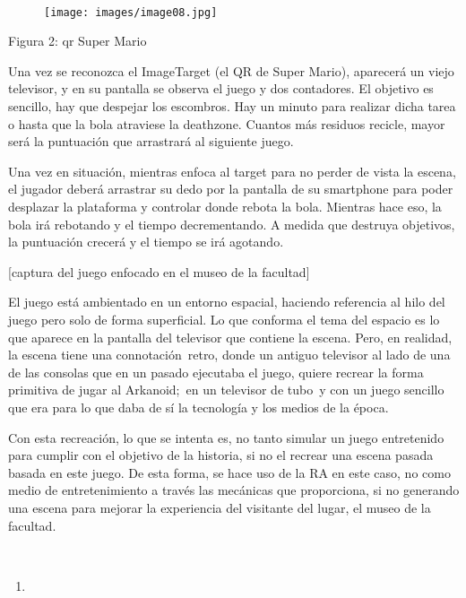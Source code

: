 ~~~~~~~~~~~~~~~~~ ~~~~~~~~~~~~~~~~~

\begin{figure}[htbp]
\centering
\texttt{[image: images/image08.jpg]}
\end{figure}

Figura 2: qr Super Mario

Una vez se reconozca el ImageTarget (el QR de Super Mario), aparecerá un
viejo televisor, y en su pantalla se observa el juego y dos contadores.
El objetivo es sencillo, hay que despejar los escombros. Hay un minuto
para realizar dicha tarea o hasta que la bola atraviese la deathzone.
Cuantos más residuos recicle, mayor será la puntuación que arrastrará al
siguiente juego.

Una vez en situación, mientras enfoca al target para no perder de vista
la escena, el jugador deberá arrastrar su dedo por la pantalla de su
smartphone para poder desplazar la plataforma y controlar donde rebota
la bola. Mientras hace eso, la bola irá rebotando y el tiempo
decrementando. A medida que destruya objetivos, la puntuación crecerá y
el tiempo se irá agotando.

{[}captura del juego enfocado en el museo de la facultad{]}

El juego está ambientado en un entorno espacial, haciendo referencia al
hilo del juego pero solo de forma superficial. Lo que conforma el tema
del espacio es lo que aparece en la pantalla del televisor que contiene
la escena. Pero, en realidad, la escena tiene una connotación~retro,
donde un antiguo televisor al lado de una de las consolas que en un
pasado ejecutaba el juego, quiere recrear la forma primitiva de jugar al
Arkanoid;~en un televisor de tubo~y con un juego sencillo que era para
lo que daba de sí la tecnología y los medios de la época.

Con esta recreación, lo que se intenta es, no tanto simular un juego
entretenido para cumplir con el objetivo de la historia, si no el
recrear una escena pasada basada en este juego. De esta forma, se hace
uso de la RA en este caso, no como medio de entretenimiento a través las
mecánicas que proporciona, si no generando una escena para mejorar la
experiencia del visitante del lugar, el museo de la facultad.

~~~~~~~~

\begin{enumerate}
\def\labelenumi{\arabic{enumi}.}
\setcounter{enumi}{2}
\item
\end{enumerate}

